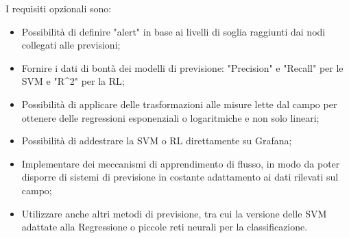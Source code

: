 \documentclass[../analisi-dei-requisiti.tex]{subfiles}
\begin{document}
	I requisiti opzionali sono:
	\begin{itemize}
		\item{Possibilità di definire "alert" in base ai livelli di soglia raggiunti dai nodi collegati alle previsioni;}
		\item{Fornire i dati di bontà dei modelli di previsione: "Precision" e "Recall" per le SVM e "R\^{}2" per la RL;}
		\item{Possibilità di applicare delle trasformazioni alle misure lette dal campo per ottenere delle regressioni esponenziali o logaritmiche e non solo lineari;}
		\item{Possibilità di addestrare la SVM o RL direttamente su Grafana;}
		\item{Implementare dei meccanismi di apprendimento di flusso, in modo da poter disporre di sistemi di previsione in costante adattamento ai dati rilevati sul campo;}
		\item{Utilizzare anche altri metodi di previsione, tra cui la versione delle SVM adattate alla Regressione o piccole reti neurali per la classificazione.}
	\end{itemize}
\end{document}
